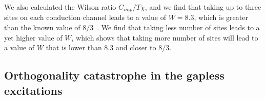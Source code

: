 \documentclass[10pt]{iopart}
\begin{document}
We also calculated the Wilson ratio $C_{imp}/T\chi$, and we find that taking up to three sites on each conduction channel leads to a value of $ W = 8.3$, which is greater than the known value of \(8/3\)~\cite{affleck_1991_overscreen,affleck_ludwig_1991,affleck_pang_cox_1992,affleck1993exact,
parcollet_olivier_large_N,affleck_2005,emery_kivelson,clarke_giamarchi_1993,zarand_2000,
vondelft_prl_1998,schofield_1997,bullaNRGreview,affleck_pang_cox_1992,pang_cox_1991,
andrei_destri_1984,Tsvelick1984,Tsvelick_1985,andrei_jerez_1995,zarand_costi_2002,
sengupta_1994,fabrizio_nozieres_1995,Coleman_tsvelik,fabrizio_gogolin_1995}. We find that taking less number of sites leads to a yet higher value of \(W\), which shows that taking more number of sites will lead to a value of \(W\) that is lower than \(8.3\) and closer to \(8/3\). 

\subsection{Orthogonality catastrophe in the gapless excitations}
\end{document}

